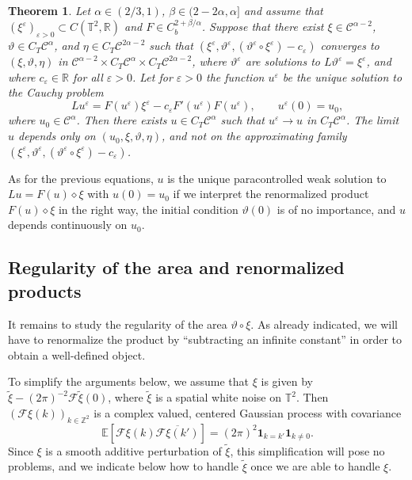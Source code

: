 \documentclass[11pt,a4paper]{article}
\newtheorem{theorem}{Theorem}[section]
\theoremstyle{remark}
\newcommand{\R}{\mathbb{R}}
\newcommand{\Z}{\mathbb{Z}}
\newcommand{\E}{\mathbb{E}}
\newcommand{\CC}{\ensuremath{\mathscr{C}}}
\newcommand{\CF}{\ensuremath{\mathscr{F}}}
\begin{document}
\begin{theorem}\label{theorem:pam existence uniqueness}
  Let $\alpha \in ( 2/3,1 )$, $\beta \in (2-2\alpha, \alpha]$ and assume that $( \xi^{\varepsilon})_{\varepsilon >0} \subset C(\mathbb{T}^2,\R)$ and $F \in C^{2+\beta/\alpha}_{b}$. Suppose that there exist $\xi \in \CC^{\alpha -2}$, $\vartheta \in C_T \CC^\alpha$, and $\eta \in C_{T} \CC^{2 \alpha -2}$ such that $( \xi^{\varepsilon} , \vartheta^\varepsilon, (\vartheta^{\varepsilon} \circ   \xi^{\varepsilon} ) -c_{\varepsilon} )$
  converges to $( \xi , \vartheta, \eta )$ in $\CC^{\alpha -2} \times C_T \CC^\alpha \times C_{T} \CC^{2 \alpha -2}$, where $\vartheta^{\varepsilon}$ are solutions to $L \vartheta^{\varepsilon} = \xi^{\varepsilon}$, and where $c_{\varepsilon} \in \mathbb{R}$ for all $\varepsilon >0$.
  Let for $\varepsilon >0$ the function $u^{\varepsilon}$ be the unique
  solution to the Cauchy problem
  \[
     L u^{\varepsilon} =F ( u^{\varepsilon} ) \xi^{\varepsilon} -c_{\varepsilon} F' ( u^{\varepsilon} ) F ( u^{\varepsilon} ) , \hspace{2em} u^{\varepsilon} ( 0 ) =u_{0},
  \]
  where $u_{0} \in \CC^{\alpha}$. Then there exists $u \in C_{T} \CC^{\alpha}$ such that
  $u^{\varepsilon} \rightarrow u$ in $C_{T} \CC^{\alpha}$. The limit $u$ depends only on $( u_{0} , \xi , \vartheta, \eta )$, and not on the approximating family $( \xi^{\varepsilon} ,\vartheta^\varepsilon, (\vartheta^{\varepsilon} \circ   \xi^{\varepsilon} ) -c_{\varepsilon} )$.
\end{theorem}

As for the previous equations, $u$ is the unique paracontrolled weak solution to $L u=F ( u )\diamond \xi$ with $u ( 0 ) =u_{0}$ if we interpret the renormalized product $F ( u ) \diamond\xi$ in the right way, the initial condition $\vartheta(0)$ is of no importance, and $u$ depends continuously on $u_0$.








\subsection{Regularity of the area and renormalized products}

It remains to study the regularity of the area $\vartheta \circ \xi$. As already indicated, we will have to renormalize the product by ``subtracting an infinite constant'' in order to obtain a well-defined object.

To simplify the arguments below, we assume that $\xi$ is given by $\tilde{\xi} - (2\pi)^{-2} \CF \tilde{\xi}(0)$, where $\tilde{\xi}$ is a spatial white noise on $\mathbb{T}^2$. Then $(\CF \xi (k))_{k\in \Z^2}$ is a complex valued, centered Gaussian process with covariance
\[
   \E[\CF \xi (k) \overline{\CF \xi(k')}] = (2\pi)^2 \mathbf{1}_{k = k'} \mathbf{1}_{k\neq 0}.
\]
Since $\xi$ is a smooth additive perturbation of $\tilde{\xi}$, this simplification will pose no problems, and we indicate below how to handle $\tilde{\xi}$ once we are able to handle $\xi$.
\end{document}
